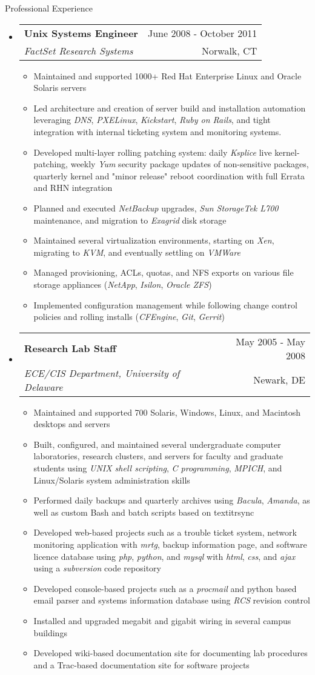 \documentclass[letterpaper,10pt]{article}
\makeatletter
\newenvironment{ressection}[1]{
	\vspace{4pt}
	{\fontfamily{phv}\selectfont\Large#1}
	\begin{itemize}
	\vspace{3pt}
}{
	\end{itemize}
}
\newcommand{\ressubitem}[1]{
	\vspace{-1pt}
	\item \begin{flushleft} #1 \end{flushleft}
}
\newcommand{\resbigitem}[4]{
	\vspace{-5pt}
	\item
	\begin{tabular*}{6in}{l@{\extracolsep{\fill}}r}
		\textbf{#1} & #2 \\
		\textit{#3} & #4\\
	\end{tabular*}
}
\newenvironment{ressubsec}[4]{
	\resbigitem{#1}{#2}{#3}{#4}
	\vspace{-2pt}
	\begin{itemize}
}{
	\end{itemize}
}
\makeatother
\begin{document}
\begin{ressection}{Professional Experience}
	\begin{ressubsec}{Unix Systems Engineer}{June 2008 - October 2011}{FactSet Research Systems}{Norwalk, CT}
		\ressubitem{Maintained and supported 1000+ Red Hat Enterprise Linux and Oracle Solaris servers}
		\ressubitem{Led architecture and creation of server build and installation automation leveraging \textit{DNS}, \textit{PXELinux}, \textit{Kickstart}, \textit{Ruby on Rails}, and tight integration with internal ticketing system and monitoring systems.}
		\ressubitem{Developed multi-layer rolling patching system: daily \textit{Ksplice} live kernel-patching, weekly \textit{Yum} security package updates of non-sensitive packages, quarterly kernel and "minor release" reboot coordination with full Errata and RHN integration}
		\ressubitem{Planned and executed \textit{NetBackup} upgrades, \textit{Sun StorageTek L700} maintenance, and migration to \textit{Exagrid} disk storage}
		\ressubitem{Maintained several virtualization environments, starting on \textit{Xen}, migrating to \textit{KVM}, and eventually settling on \textit{VMWare}}
		\ressubitem{Managed provisioning, ACLs, quotas, and NFS exports on various file storage appliances (\textit{NetApp}, \textit{Isilon}, \textit{Oracle ZFS})}
		\ressubitem{Implemented configuration management while following change control policies and rolling installs (\textit{CFEngine}, \textit{Git}, \textit{Gerrit})}
	\end{ressubsec}

	\begin{ressubsec}{Research Lab Staff}{May 2005 - May 2008}{ECE/CIS Department, University of Delaware}{Newark, DE}
		\ressubitem{Maintained and supported 700 Solaris, Windows, Linux, and Macintosh desktops and servers}
		\ressubitem{Built, configured, and maintained several undergraduate computer laboratories, research clusters, and servers for faculty and graduate students using \textit{UNIX shell scripting}, \textit{C programming}, \textit{MPICH}, and Linux/Solaris system administration skills}
		\ressubitem{Performed daily backups and quarterly archives using \textit{Bacula}, \textit{Amanda}, as well as custom Bash and batch scripts based on textit{rsync}}
		\ressubitem{Developed web-based projects such as a trouble ticket system, network monitoring application with \textit{mrtg}, backup information page, and software licence database using \textit{php}, \textit{python}, and \textit{mysql} with \textit{html}, \textit{css}, and \textit{ajax} using a \textit{subversion} code repository}
		\ressubitem{Developed console-based projects such as a \textit{procmail} and python based email parser and systems information database using \textit{RCS} revision control}
		\ressubitem{Installed and upgraded megabit and gigabit wiring in several campus buildings}
		\ressubitem{Developed wiki-based documentation site for documenting lab procedures and a Trac-based documentation site for software projects}
	\end{ressubsec}


\end{ressection}
\end{document}

